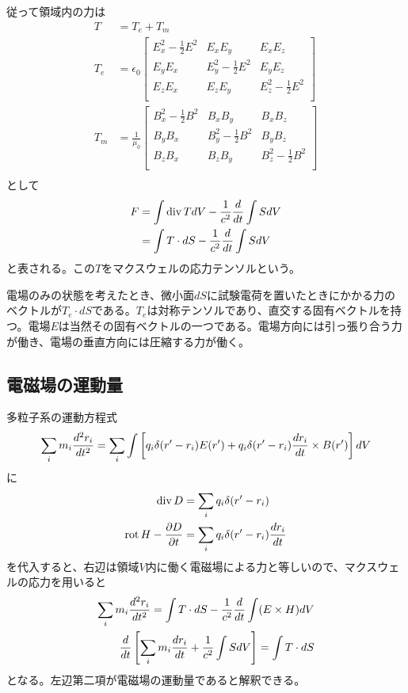     従って領域内の力は
    \begin{align*}
        T &= T_e + T_m\\
        T_e &= \epsilon_0
        \begin{bmatrix}
            E_x^2 - \frac{1}{2}E^2 & E_xE_y & E_xE_z\\
            E_yE_x & E_y^2 - \frac{1}{2}E^2 & E_yE_z\\
            E_zE_x & E_zE_y & E_z^2 - \frac{1}{2}E^2\\
        \end{bmatrix}\\
        T_m &= \frac{1}{\mu_0}
        \begin{bmatrix}
            B_x^2 - \frac{1}{2}B^2 & B_xB_y & B_xB_z\\
            B_yB_x & B_y^2 - \frac{1}{2}B^2 & B_yB_z\\
            B_zB_x & B_zB_y & B_z^2 - \frac{1}{2}B^2\\
        \end{bmatrix}\\
    \end{align*}
    として
    \begin{align*}
        F
        &= \int \div T dV - \frac{1}{c^2}\de{t}\int S dV\\
        &= \int T \cdot dS - \frac{1}{c^2}\de{t}\int S dV\\
    \end{align*}
    と表される。この$T$をマクスウェルの応力テンソルという。

    電場のみの状態を考えたとき、微小面$dS$に試験電荷を置いたときにかかる力のベクトルが$T_e \cdot dS$である。$T_e$は対称テンソルであり、直交する固有ベクトルを持つ。電場$E$は当然その固有ベクトルの一つである。電場方向には引っ張り合う力が働き、電場の垂直方向には圧縮する力が働く。

\subsection{電磁場の運動量}
    多粒子系の運動方程式
        \[\sum_i m_i\dd[r_i]{t} = \sum_i \int \left[q_i\delta(r' - r_i)E(r') + q_i\delta(r' - r_i)\de[r_i]{t} \times B(r')\right] dV\]
    に
    \begin{align*}
        \div D &= \sum_i q_i\delta(r' - r_i)\\
        \rot H - \pd[D]{t} &= \sum_i q_i\delta(r' - r_i)\de[r_i]{t}\\
    \end{align*}
    を代入すると、右辺は領域$V$内に働く電磁場による力と等しいので、マクスウェルの応力を用いると
    \begin{align*}
        \sum_i m_i\dd[r_i]{t} = \int T \cdot dS - \frac{1}{c^2}\de{t}\int (E \times H) dV\\
        \de{t}\left[\sum_i m_i\de[r_i]{t} + \frac{1}{c^2}\int S dV\right] = \int T \cdot dS\\
    \end{align*}
    となる。左辺第二項が電磁場の運動量であると解釈できる。

